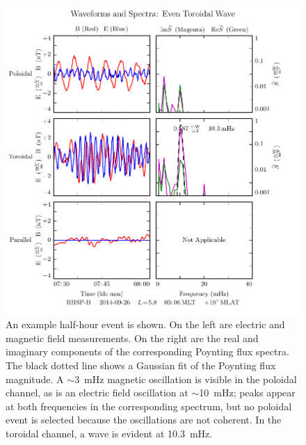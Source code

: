 \documentclass{article}
\newcommand{\about}{\ensuremath{\sim}}
\begin{document}
\begin{figure}
    \begin{center}
    \includegraphics[width=\textwidth]{figures/fig_event.pdf}
    \caption{
        An example half-hour event is shown. On the left are electric and magnetic field measurements. On the right are the real and imaginary components of the corresponding Poynting flux spectra. The black dotted line shows a Gaussian fit of the Poynting flux magnitude. A \about\SI{3}{\mHz} magnetic oscillation is visible in the poloidal channel, as is an electric field oscillation at \about\SI{10}{\mHz}; peaks appear at both frequencies in the corresponding spectrum, but no poloidal event is selected because the oscillations are not coherent. In the toroidal channel, a wave is evident at \SI{10.3}{\mHz}.
    }
    \label{fig_event}
    \end{center}
\end{figure}

\end{document}
